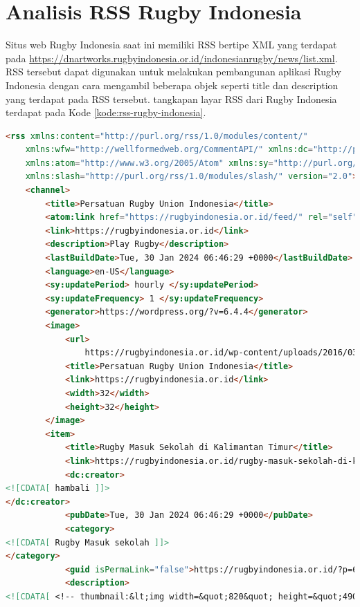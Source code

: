 \section{Analisis RSS Rugby Indonesia}
Situs web Rugby Indonesia saat ini memiliki RSS bertipe XML yang terdapat pada \url{https://dnartworks.rugbyindonesia.or.id/indonesianrugby/news/list.xml}. RSS tersebut dapat digunakan untuk melakukan pembangunan aplikasi Rugby Indonesia dengan cara mengambil beberapa objek seperti title dan description yang terdapat pada RSS tersebut. tangkapan layar RSS dari Rugby Indonesia terdapat pada Kode \ref{kode:rss-rugby-indonesia}.

\begin{lstlisting}[language=HTML, caption=Potongan Kode RSS Rugby Indonesia, label=kode:rss-rugby-indonesia]
<rss xmlns:content="http://purl.org/rss/1.0/modules/content/"
    xmlns:wfw="http://wellformedweb.org/CommentAPI/" xmlns:dc="http://purl.org/dc/elements/1.1/"
    xmlns:atom="http://www.w3.org/2005/Atom" xmlns:sy="http://purl.org/rss/1.0/modules/syndication/"
    xmlns:slash="http://purl.org/rss/1.0/modules/slash/" version="2.0">
    <channel>
        <title>Persatuan Rugby Union Indonesia</title>
        <atom:link href="https://rugbyindonesia.or.id/feed/" rel="self" type="application/rss+xml" />
        <link>https://rugbyindonesia.or.id</link>
        <description>Play Rugby</description>
        <lastBuildDate>Tue, 30 Jan 2024 06:46:29 +0000</lastBuildDate>
        <language>en-US</language>
        <sy:updatePeriod> hourly </sy:updatePeriod>
        <sy:updateFrequency> 1 </sy:updateFrequency>
        <generator>https://wordpress.org/?v=6.4.4</generator>
        <image>
            <url>
                https://rugbyindonesia.or.id/wp-content/uploads/2016/03/cropped-PRUI-Default-Logo-32x32.jpg</url>
            <title>Persatuan Rugby Union Indonesia</title>
            <link>https://rugbyindonesia.or.id</link>
            <width>32</width>
            <height>32</height>
        </image>
        <item>
            <title>Rugby Masuk Sekolah di Kalimantan Timur</title>
            <link>https://rugbyindonesia.or.id/rugby-masuk-sekolah-di-kalimantan-timur/</link>
            <dc:creator>
<![CDATA[ hambali ]]>
</dc:creator>
            <pubDate>Tue, 30 Jan 2024 06:46:29 +0000</pubDate>
            <category>
<![CDATA[ Rugby Masuk sekolah ]]>
</category>
            <guid isPermaLink="false">https://rugbyindonesia.or.id/?p=6435</guid>
            <description>
<![CDATA[ <!-- thumbnail:&lt;img width=&quot;820&quot; height=&quot;490&quot; src=&quot;https://rugbyindonesia.or.id/wp-content/uploads/2024/01/Kaltim-820x490.jpg&quot; class=&quot;attachment-post-thumbnail size-post-thumbnail wp-post-image&quot; alt=&quot;&quot; decoding=&quot;async&quot; fetchpriority=&quot;high&quot; /&gt;--><!-- wp:paragraph --> <p>2 Januari 2024, [NEWS] Kalimantan Timur semangat menjalankan program Rugby Masuk Sekolah. Pengurus PRUI Kalimantan Timur langsung mulai di SDN 12 Sambutan, Samarinda. Target awalnya, PRUI Kalimantan Timur akan menjalankan program ini di 8 sekolah.</p> <!-- /wp:paragraph --> ]]>

\end{lstlisting}
